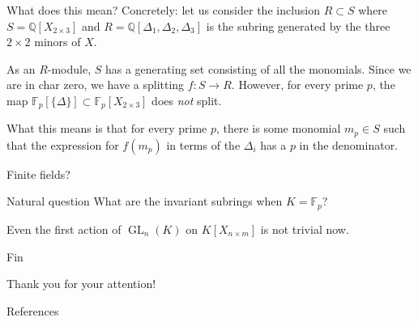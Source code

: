 \documentclass{beamer}
\DeclareMathOperator{\GL}{GL}
\begin{document}
	\begin{frame}{What does this mean?}
		Concretely: let us consider the inclusion $R \subset S$ where $S = \mathbb{Q}[X_{2 \times 3}]$ and $R = \mathbb{Q}[\Delta_{1}, \Delta_{2}, \Delta_{3}]$ is the subring generated by the three $2 \times 2$ minors of $X$. \pause

		As an $R$-module, $S$ has a generating set consisting of all the monomials. \pause Since we are in char zero, we have a splitting $f : S \to R$. \pause However, for every prime $p$, the map $\mathbb{F}_{p}[\{\Delta\}] \subset \mathbb{F}_{p}[X_{2 \times 3}]$ does \emph{not} split. 

		\pause What this means is that for every prime $p$, there is some monomial $m_{p} \in S$ such that the expression for $f(m_{p})$ in terms of the $\Delta_{i}$ has a $p$ in the denominator.
	\end{frame}

	\begin{frame}{Finite fields?}
		\begin{block}{Natural question}
			What are the invariant subrings when $K = \mathbb{F}_{p}$?
		\end{block}
		Even the first action of $\GL_{n}(K)$ on $K[X_{n \times m}]$ is not trivial now.
	\end{frame}

	\begin{frame}{Fin}

		\vfill 

		Thank you for your attention!

		\vfill
	\end{frame}

	\begin{frame}{References}
		\printbibliography
	\end{frame}
\end{document}
